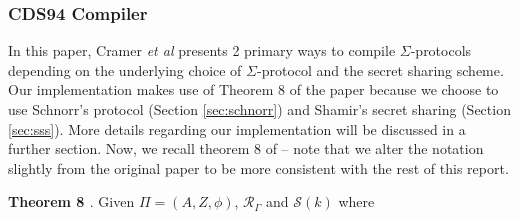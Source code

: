 \subsubsection{CDS94 Compiler}
In this paper, Cramer {\em{et al}} \cite{CDS94} presents 2 primary ways to compile $\Sigma$-protocols depending 
on the underlying choice of $\Sigma$-protocol and the secret sharing scheme. Our implementation makes use of Theorem 
8 of the paper because we choose to use Schnorr's protocol (Section \ref{sec:schnorr}) and Shamir's secret sharing 
(Section \ref{sec:sss}). More details regarding our implementation will be discussed in a further section. Now, we recall 
theorem 8 of \cite{CDS94} -- note that we alter the notation slightly from the original paper to be more consistent 
with the rest of this report.






\textbf{Theorem 8 \cite{CDS94}}. Given $\Pi = (A, Z, \phi)$, $\mathcal R_\Gamma$ and $\mathcal S(k)$ where

